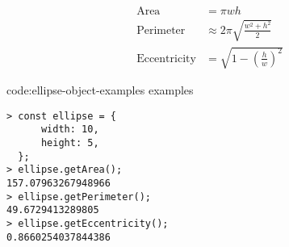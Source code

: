 \begin{equation}\begin{aligned}
    \text{Area}&=\pi wh \\
    \text{Perimeter}&\approx2\pi\sqrt{\frac{w^2+h^2}{2}} \\
    \text{Eccentricity}&=\sqrt{1-\left(\frac{h}{w}\right)^2}
\end{aligned}\end{equation}

\begin{code}{code:ellipse-object-examples}{ examples}
\begin{verbatim}
> const ellipse = {
      width: 10,
      height: 5,
  };
> ellipse.getArea();
157.07963267948966
> ellipse.getPerimeter();
49.6729413289805
> ellipse.getEccentricity();
0.8660254037844386
\end{verbatim}
\end{code}
